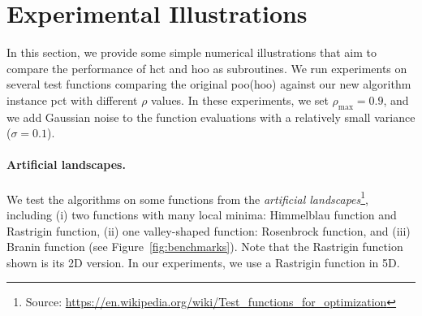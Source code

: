 \section{Experimental Illustrations}\label{sec:gpo.experiments}

In this section, we provide some simple numerical illustrations that aim to compare the performance of \gls{hct} and \gls{hoo} as subroutines. We run experiments on several test functions comparing the original \gls{poo}(\gls{hoo}) against our new algorithm instance \gls{pct} with different $\rho$ values. In these experiments, we set $\rho_{\max} = 0.9$, and we add Gaussian noise to the function evaluations with a relatively small variance ($\sigma=0.1$).

\paragraph{Artificial landscapes.}
We test the algorithms on some functions from the \emph{artificial landscapes}\footnote{Source: \url{https://en.wikipedia.org/wiki/Test_functions_for_optimization}}, including (i) two functions with many local minima: Himmelblau function and Rastrigin function, (ii) one valley-shaped function: Rosenbrock function, and (iii) Branin function (see Figure~\ref{fig:benchmarks}). Note that the Rastrigin function shown is its 2D version. In our experiments, we use a Rastrigin function in 5D.


